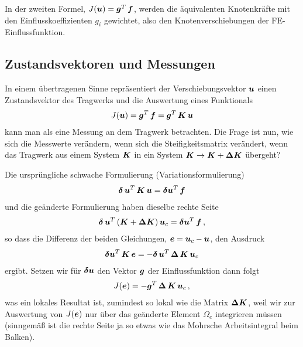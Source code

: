 In der zweiten Formel, $J(\mbox{\boldmath $u$}) = \mbox{\boldmath $g$}^T\,\mbox{\boldmath $f$}$, werden die \"{a}quivalenten Knotenkr\"{a}fte mit den Einflusskoeffizienten $g_i $ gewichtet, also den Knotenverschiebungen der FE-Einflussfunktion.

{\textcolor{sectionTitleBlue}{\section{Zustandsvektoren und Messungen}}}\label{Zustandsvektoren}

In einem \"{u}bertragenen Sinne repr\"{a}sentiert der Verschiebungsvektor $\mbox{\boldmath $u$}$ einen Zustandsvektor des Tragwerks und die Auswertung eines Funktionals
\begin{align}
J(\mbox{\boldmath $u$}) = \mbox{\boldmath $g$}^T\,\mbox{\boldmath $f$} = \mbox{\boldmath $g$}^T\,\mbox{\boldmath $K$}\,\mbox{\boldmath $u$}
\end{align}
kann man als eine Messung an dem Tragwerk betrachten. Die Frage ist nun, wie sich die Messwerte ver\"{a}ndern, wenn sich die Steifigkeitsmatrix ver\"{a}ndert, wenn das Tragwerk aus einem System $\mbox{\boldmath $K$}$ in ein System $\mbox{\boldmath $K$} \to \mbox{\boldmath $K$} + \mbox{\boldmath $\Delta$} \mbox{\boldmath $K$}$ \"{u}bergeht?

Die urspr\"{u}ngliche schwache Formulierung (Variationsformulierung)
\begin{align}
\mbox{\boldmath $\delta$}\,\mbox{\boldmath $u$}^T\,\mbox{\boldmath $K$}\,\mbox{\boldmath $u$}= \mbox{\boldmath $\delta$} \mbox{\boldmath $u$}^T \,\mbox{\boldmath $f$}
\end{align}
und die ge\"{a}nderte Formulierung haben dieselbe rechte Seite
\begin{align}
\mbox{\boldmath $\delta$}\,\mbox{\boldmath $u$}^T\,(\mbox{\boldmath $K$} + \mbox{\boldmath $\Delta$} \mbox{\boldmath $K$}) \,\mbox{\boldmath $u$}_c= \mbox{\boldmath $\delta$} \mbox{\boldmath $u$}^T \,\mbox{\boldmath $f$}\,,
\end{align}
so dass die Differenz der beiden Gleichungen, $\mbox{\boldmath $e$} = \mbox{\boldmath $u$}_c - \mbox{\boldmath $u$}$, den Ausdruck
\begin{align}
\mbox{\boldmath $\delta$} \mbox{\boldmath $u$}^T\,\mbox{\boldmath $K$}\,\mbox{\boldmath $e$} = - \mbox{\boldmath $\delta$} \,\mbox{\boldmath $u$}^T\,\mbox{\boldmath $\Delta$}\,\mbox{\boldmath $K$}\,\mbox{\boldmath $u$}_c
\end{align}
ergibt. Setzen wir f\"{u}r $\mbox{\boldmath $\delta$} \mbox{\boldmath $u$}$ den Vektor $\mbox{\boldmath $g$}$ der Einflussfunktion dann folgt
\begin{align}
J(\mbox{\boldmath $e$})= -  \mbox{\boldmath $g$}^T\,\mbox{\boldmath $\Delta$}\,\mbox{\boldmath $K$}\,\mbox{\boldmath $u$}_c\,,
\end{align}
was ein lokales Resultat ist, zumindest so lokal wie die Matrix $\mbox{\boldmath $\Delta$} \mbox{\boldmath $K$}$, weil wir zur Auswertung von $J(\mbox{\boldmath $e$})$ nur \"{u}ber das ge\"{a}nderte Element $\Omega_e$ integrieren m\"{u}ssen (sinngem\"{a}{\ss} ist die rechte Seite ja so etwas wie das Mohrsche Arbeitsintegral beim Balken).

